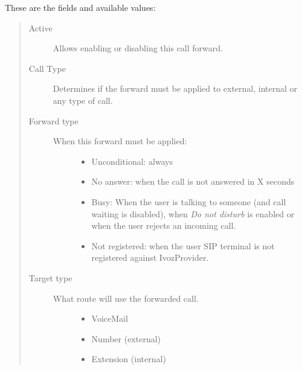 \documentclass[letterpaper,10pt,english]{sphinxmanual}
\begin{document}
These are the fields and available values:
\begin{quote}
\begin{description}
\item[{Active}] \leavevmode
Allows enabling or disabling this call forward.

\item[{Call Type}] \leavevmode
Determines if the forward must be applied to external, internal or any
type of call.

\item[{Forward type}] \leavevmode\begin{description}
\item[{When this forward must be applied:}] \leavevmode\begin{itemize}
\item {} 
Unconditional: always

\item {} 
No answer: when the call is not answered in X seconds

\item {} 
Busy: When the user is talking to someone (and call waiting is
disabled), when \emph{Do not disturb} is enabled or when the user
rejects an incoming call.

\item {} 
Not registered: when the user SIP terminal is not registered
against IvozProvider.

\end{itemize}

\end{description}

\item[{Target type}] \leavevmode\begin{description}
\item[{What route will use the forwarded call.}] \leavevmode\begin{itemize}
\item {} 
VoiceMail

\item {} 
Number (external)

\item {} 
Extension (internal)

\end{itemize}

\end{description}

\end{description}
\end{quote}
\end{document}
